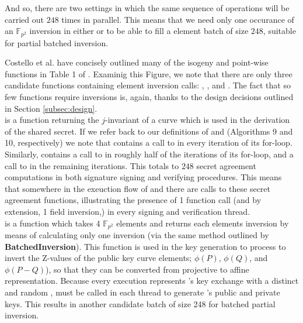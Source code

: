 And so, there are two settings in which the same sequence of operations will be carried out $248$ times in parallel. This means that we need only one occurance of an $\mathbb{F}_{p^2}$ inversion in either  or  to be able to fill a element batch of size $248$, suitable for partial batched inversion.

Costello et al. have concisely outlined many of the \sidh isogeny and point-wise functions in Table 1 of \cite{effalg}. Examinig this Figure, we note that there are only three candidate functions containing element inversion calls: , , and . The fact that so few functions require inversions is, again, thanks to the design decisions outlined in Section \ref{subsec:design}.\\

\noindent
{} is a function returning the $j$-invariant of a curve which is used in the derivation of the shared secret. If we refer back to our definitions of  and  (Algorithms 9 and 10, respectively) we note that  contains a call to  in every iteration of its for-loop. Similarly,  contains a call to  in roughly half of the iterations of its for-loop, and a call to  in the remaining iterations. This totals to $248$ secret agreement computations in both signature signing and verifying procedures. This means that somewhere in the exeuction flow of  and  there are calls to these secret agreement functions, illustrating the presence of 1  function call (and by extension, 1 field inversion,) in every signing and verification thread.\\

\noindent
{} is a function which takes 4 $\mathbb{F}_{p^2}$ elements and returns each elements inversion by means of calculating only one inversion (via the same method outlined by \textbf{BatchedInversion}). This function is used in the key generation to process to invert the Z-values of the public key curve elements; $\phi(P)$, $\phi(Q)$, and $\phi(P-Q)$), so that they can be converted from projective to affine representation. Because every  execution represents \bob's key exchange with a distinct and random \randall,  must be called in each thread to generate \randall's public and private keys. This results in another candidate batch of size 248 for batched partial inversion.\\

